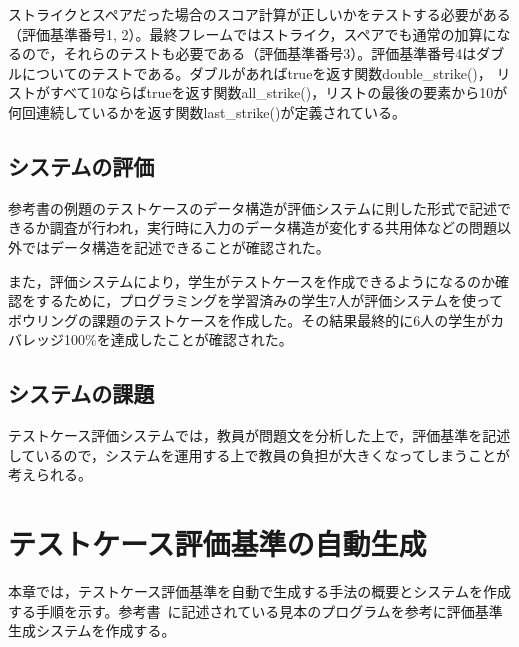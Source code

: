 \documentclass{tpu-sotu}
\begin{document}
ストライクとスペアだった場合のスコア計算が正しいかをテストする必要がある（評価基準番号1, 2）。最終フレームではストライク，スペアでも通常の加算になるので，それらのテストも必要である（評価基準番号3）。評価基準番号4はダブルについてのテストである。ダブルがあればtrueを返す関数double\_strike()， リストがすべて10ならばtrueを返す関数all\_strike()，リストの最後の要素から10が何回連続しているかを返す関数last\_strike()が定義されている。
\section{システムの評価}
参考書の例題のテストケースのデータ構造が評価システムに則した形式で記述できるか調査が行われ，実行時に入力のデータ構造が変化する共用体などの問題以外ではデータ構造を記述できることが確認された。

また，評価システムにより，学生がテストケースを作成できるようになるのか確認をするために，プログラミングを学習済みの学生7人が評価システムを使ってボウリングの課題のテストケースを作成した。その結果最終的に6人の学生がカバレッジ100\%を達成したことが確認された。

\section{システムの課題}
テストケース評価システムでは，教員が問題文を分析した上で，評価基準を記述しているので，システムを運用する上で教員の負担が大きくなってしまうことが考えられる。

\chapter{テストケース評価基準の自動生成}
本章では，テストケース評価基準を自動で生成する手法の概要とシステムを作成する手順を示す。参考書~\cite{b1}に記述されている見本のプログラムを参考に評価基準生成システムを作成する。
\end{document}
